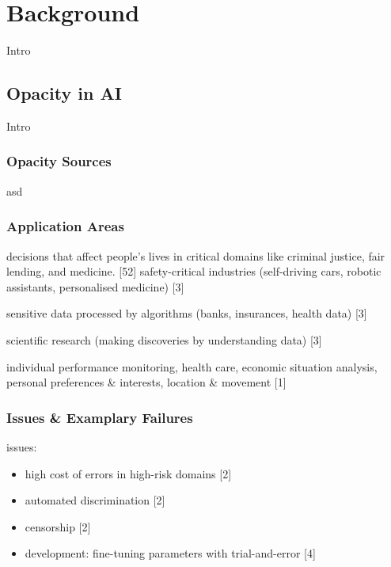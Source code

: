 \section{Background}

Intro


\subsection{Opacity in AI}
Intro

\subsubsection{Opacity Sources}
asd

\subsubsection{Application Areas}
decisions that affect people’s lives in critical domains like criminal
justice, fair lending, and medicine. [52]\newline
safety-critical industries (self-driving cars, robotic assistants, personalised medicine) [3]\newline

sensitive data processed by algorithms (banks, insurances, health data) [3]\newline

scientific research (making discoveries by understanding data) [3]\newline

individual performance monitoring, health care, economic situation analysis, personal preferences \& interests, location \& movement [1]\newline





\subsubsection{Issues \& Examplary Failures}
issues:
\begin{itemize}
	\item high cost of errors in high-risk domains [2]
	\item automated discrimination [2]
	\item censorship [2]
	\item development: fine-tuning parameters with trial-and-error [4]
\end{itemize}




